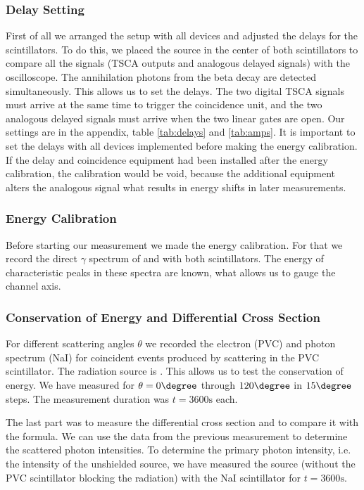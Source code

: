 \subsubsection{Delay Setting}
First of all we arranged the setup with all devices and adjusted the delays
for the scintillators. To do this, we placed the \Na  source in the center
of both scintillators to compare all the signals (TSCA outputs and analogous
delayed signals) with the
oscilloscope. The annihilation photons from the beta decay are detected
simultaneously. This allows us to set the delays. The two digital TSCA
signals must arrive at the same time to
trigger the coincidence unit, and the two analogous delayed signals must
arrive when the two linear gates are open. Our settings are in the appendix,
table \ref{tab:delays} and \ref{tab:amps}. It is
important to set the delays with all devices implemented before making the
energy calibration. If the
delay and coincidence equipment had been installed after the energy
calibration, the calibration would be void, because the additional
equipment alters the analogous signal what results in energy shifts in later
measurements.

\subsubsection{Energy Calibration}
Before starting our measurement we made the energy calibration. For that we
record the direct $\gamma$ spectrum of \Na and \Cs with both scintillators. 
The energy of characteristic peaks in these spectra are known, what allows
us to gauge the channel axis.

\subsubsection{Conservation of Energy and Differential Cross Section}
For different scattering angles $\theta$ we recorded the electron (PVC) and
photon spectrum (NaI) for coincident events produced by \compton scattering
in the PVC scintillator. The radiation source is \Cs. This allows us to test
the conservation of energy. We have measured for $\theta =0\degree$ through
$120\degree$ in $15\degree$ steps. The measurement duration was
$t=3600\mathrm{s}$ each.

The last part was to measure the differential cross section and to compare
it with
the \kleinn  formula. We can use the data from the previous measurement to
determine the scattered photon intensities. To determine the primary photon
intensity, i.e. the intensity of the unshielded \Cs source, we have measured
the \Cs source (without the PVC scintillator blocking the radiation) with
the NaI scintillator for $t=3600\mathrm{s}$.

